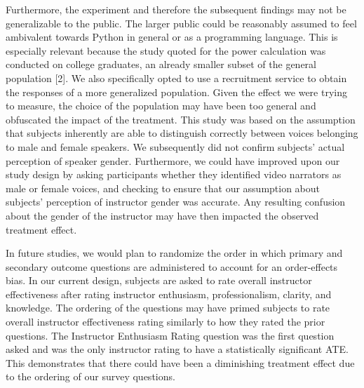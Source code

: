 \documentclass[
]{article}
\begin{document}
Furthermore, the experiment and therefore the subsequent findings may
not be generalizable to the public. The larger public could be
reasonably assumed to feel ambivalent towards Python in general or as a
programming language. This is especially relevant because the study
quoted for the power calculation was conducted on college graduates, an
already smaller subset of the general population {[}2{]}. We also
specifically opted to use a recruitment service to obtain the responses
of a more generalized population. Given the effect we were trying to
measure, the choice of the population may have been too general and
obfuscated the impact of the treatment. This study was based on the
assumption that subjects inherently are able to distinguish correctly
between voices belonging to male and female speakers. We subsequently
did not confirm subjects' actual perception of speaker gender.
Furthermore, we could have improved upon our study design by asking
participants whether they identified video narrators as male or female
voices, and checking to ensure that our assumption about subjects'
perception of instructor gender was accurate. Any resulting confusion
about the gender of the instructor may have then impacted the observed
treatment effect.

In future studies, we would plan to randomize the order in which primary
and secondary outcome questions are administered to account for an
order-effects bias. In our current design, subjects are asked to rate
overall instructor effectiveness after rating instructor enthusiasm,
professionalism, clarity, and knowledge. The ordering of the questions
may have primed subjects to rate overall instructor effectiveness rating
similarly to how they rated the prior questions. The Instructor
Enthusiasm Rating question was the first question asked and was the only
instructor rating to have a statistically significant ATE. This
demonstrates that there could have been a diminishing treatment effect
due to the ordering of our survey questions.
\end{document}

